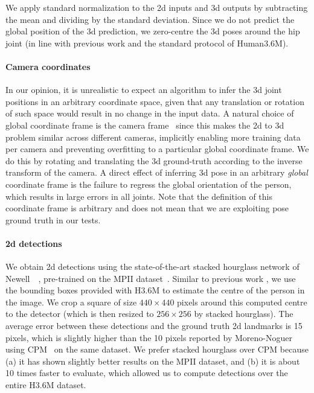 \documentclass[10pt,twocolumn,letterpaper]{article}
\begin{document}
We apply standard normalization to the 2d inputs and 3d outputs by subtracting the mean and dividing by the standard deviation. 
Since we do not predict the global position of the 3d prediction, we zero-centre the 3d poses around the hip joint (in line with previous work and the standard protocol of Human3.6M).

\paragraph{Camera coordinates}
In our opinion, it is unrealistic to expect an algorithm to infer the 3d joint positions in an arbitrary coordinate space, given that any translation or rotation of such space would result in no change in the input data.
A natural choice of global coordinate frame is the camera frame~\cite{tekin2016direct,zhou2016sparseness,li2015maximum,volumetric,du2016marker,zhou2016deep} since this makes the 2d to 3d problem similar across different cameras, implicitly enabling more training data per camera and preventing overfitting to a particular global coordinate frame.
We do this by rotating and translating the 3d ground-truth according to the inverse transform of the camera.
A direct effect of inferring 3d pose in an arbitrary \emph{global} coordinate frame is the failure to regress the global orientation of the person, which results in large errors in all joints. Note that the definition of this coordinate frame is arbitrary and does not mean that we are exploiting pose ground truth in our tests.

\paragraph{2d detections} 
We obtain 2d detections using the state-of-the-art stacked hourglass network of Newell~\etal~\cite{stacked-hourglass}, pre-trained on the MPII dataset~\cite{mpii}. Similar to previous work \cite{tekin2016direct, distance-matrix,li2015maximum,h36m,park20163d}, we use the bounding boxes provided with H3.6M to estimate the centre of the person in the image.
We crop a square of size $440 \times 440$ pixels around this computed centre to the detector (which is then resized to $256 \times 256$ by stacked hourglass).
The average error between these detections and the ground truth 2d landmarks is 15 pixels, which is slightly higher than the 10 pixels reported by Moreno-Noguer~\cite{distance-matrix} using CPM~\cite{cpm} on the same dataset.
We prefer stacked hourglass over CPM because (a) it has shown slightly better results on the MPII dataset, and (b) it is about 10 times faster to evaluate, which allowed us to compute detections over the entire H3.6M dataset.
\end{document}
